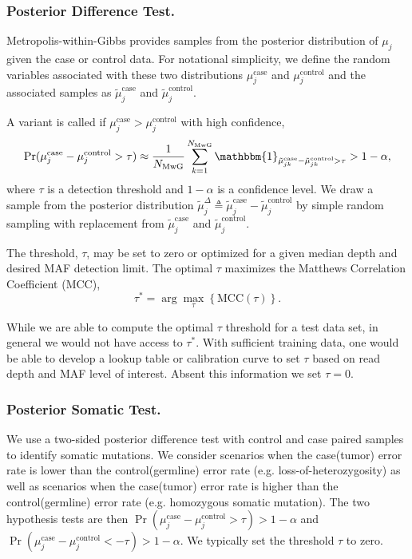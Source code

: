 \documentclass{bioinfo}
\begin{document}
\subsubsection*{Posterior Difference Test.}
Metropolis-within-Gibbs provides samples from the posterior distribution of $\mu_j$ given the case or control data. For notational simplicity, we define the random variables associated with these two distributions $\mu_j^{\text{case}}$ and $\mu_j^{\text{control}}$ and the associated samples as $\tilde{\mu}_j^{\text{case}}$ and $\tilde{\mu}_j^{\text{control}}$.

A variant is called if $\mu_j^{\text{case}} > \mu_j^{\text{control}}$ with high confidence,
\begin{equation}\label{eqn:bayes_test}
	\Pr( \mu_j^{\text{case}} - \mu_j^{\text{control}}  > \tau ) \approx \frac{1}{N_{\text{MwG}}} \sum_{k=1}^{N_{\text{MwG}}} \mathbbm{1}_{\tilde{\mu}_{jk}^{\text{case}} - \tilde{\mu}_{jk}^{\text{control}} > \tau } > 1-\alpha,
\end{equation}
where $\tau$ is a detection threshold and $1-\alpha$ is a confidence level. We draw a sample from the posterior distribution $\tilde{\mu}_j^{\Delta} \triangleq \tilde{\mu}_j^{\text{case}} - \tilde{\mu}_j^{\text{control}}$ by simple random sampling with replacement from $\tilde{\mu}_j^{\text{case}}$ and $\tilde{\mu}_j^{\text{control}}$.

The threshold, $\tau$, may be set to zero or optimized for a given median depth and desired MAF detection limit. The optimal $\tau$ maximizes the Matthews Correlation Coefficient (MCC),
\begin{equation}
	\tau^* = \arg\max_\tau \left\{ \text{MCC}(\tau)\right\}.
\end{equation}

While we are able to compute the optimal $\tau$ threshold for a test data set, in general we would not have access to $\tau^*$. With sufficient training data, one would be able to develop a lookup table or calibration curve to set $\tau$ based on read depth and MAF level of interest. Absent this information we set $\tau = 0$.

\subsubsection*{Posterior Somatic Test.}

We use a two-sided posterior difference test with control and case paired samples to identify somatic mutations. We consider scenarios when the case(tumor) error rate is lower than the control(germline) error rate (e.g. loss-of-heterozygosity) as well as scenarios when the case(tumor) error rate is higher than the control(germline) error rate (e.g. homozygous somatic mutation). The two hypothesis tests are then $\Pr( \mu_j^{\text{case}} - \mu_j^{\text{control}} > \tau ) > 1-\alpha$ and $\Pr( \mu_j^{\text{case}} - \mu_j^{\text{control}} < -\tau ) > 1-\alpha$. We typically set the threshold $ \tau $ to zero.
\end{document}
